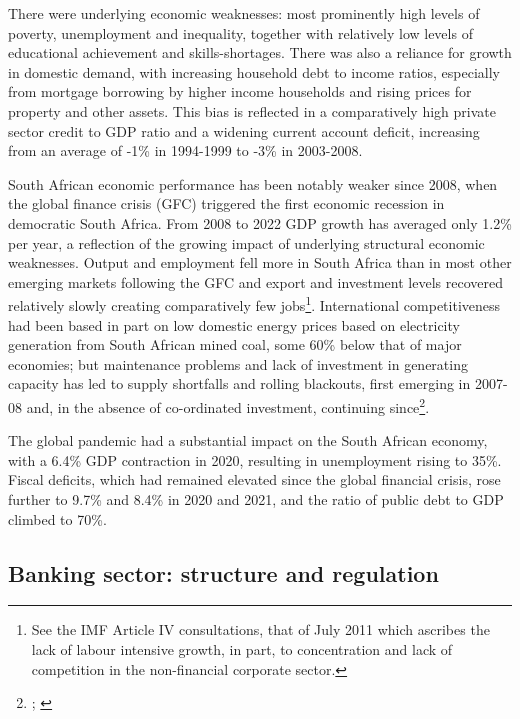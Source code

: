 \documentclass[
  12,
]{article}
\begin{document}
There were underlying economic weaknesses: most prominently high levels of poverty, unemployment and inequality, together with relatively low levels of educational achievement and skills-shortages. There was also a reliance for growth in domestic demand, with increasing household debt to income ratios, especially from mortgage borrowing by higher income households and rising prices for property and other assets. This bias is reflected in a comparatively high private sector credit to GDP ratio and a widening current account deficit, increasing from an average of -1\% in 1994-1999 to -3\% in 2003-2008.

South African economic performance has been notably weaker since 2008, when the global finance crisis (GFC) triggered the first economic recession in democratic South Africa. From 2008 to 2022 GDP growth has averaged only 1.2\% per year, a reflection of the growing impact of underlying structural economic weaknesses. Output and employment fell more in South Africa than in most other emerging markets following the GFC and export and investment levels recovered relatively slowly creating comparatively few jobs\footnote{See the IMF Article IV consultations, that of July 2011 which ascribes the lack of labour intensive growth, in part, to concentration and lack of competition in the non-financial corporate sector.}. International competitiveness had been based in part on low domestic energy prices based on electricity generation from South African mined coal, some 60\% below that of major economies; but maintenance problems and lack of investment in generating capacity has led to supply shortfalls and rolling blackouts, first emerging in 2007-08 and, in the absence of co-ordinated investment, continuing since\footnote{\citet{ateba2019strategic}; \citet{folly2021competition}}.

The global pandemic had a substantial impact on the South African economy, with a 6.4\% GDP contraction in 2020, resulting in unemployment rising to 35\%. Fiscal deficits, which had remained elevated since the global financial crisis, rose further to 9.7\% and 8.4\% in 2020 and 2021, and the ratio of public debt to GDP climbed to 70\%.

\hypertarget{banking-sector-structure-and-regulation}{%
\subsection{Banking sector: structure and regulation}\label{banking-sector-structure-and-regulation}}
\end{document}
